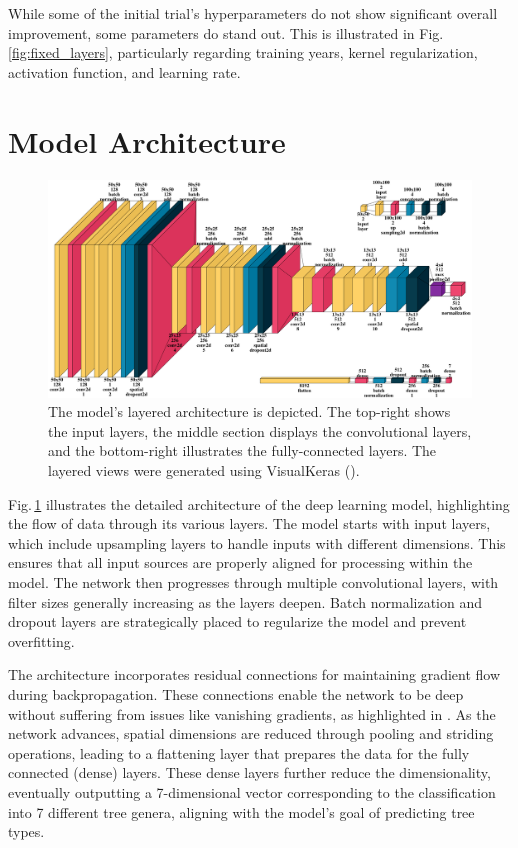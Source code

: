 While some of the initial trial's hyperparameters do not show significant overall improvement, some parameters do stand out. This is illustrated in Fig.\,\ref{fig:fixed_layers}, particularly regarding training years, kernel regularization, activation function, and learning rate.

\section{Model Architecture}

\begin{figure}[ht]
    \centering
    \includegraphics[width=0.9\linewidth]{figures/figures_tuner/model_layered_view.png}
    \caption{The model's layered architecture is depicted. The top-right shows the input layers, the middle section displays the convolutional layers, and the bottom-right illustrates the fully-connected layers. The layered views were generated using VisualKeras (\cite{visualkeras}).}
    \label{fig:model_layered_view}
\end{figure}

Fig.\,\ref{fig:model_layered_view} illustrates the detailed architecture of the deep learning model, highlighting the flow of data through its various layers. The model starts with input layers, which include upsampling layers to handle inputs with different dimensions. This ensures that all input sources are properly aligned for processing within the model. The network then progresses through multiple convolutional layers, with filter sizes generally increasing as the layers deepen. Batch normalization and dropout layers are strategically placed to regularize the model and prevent overfitting.

The architecture incorporates residual connections for maintaining gradient flow during backpropagation. These connections enable the network to be deep without suffering from issues like vanishing gradients, as highlighted in \cite{resnet}. As the network advances, spatial dimensions are reduced through pooling and striding operations, leading to a flattening layer that prepares the data for the fully connected (dense) layers. These dense layers further reduce the dimensionality, eventually outputting a 7-dimensional vector corresponding to the classification into 7 different tree genera, aligning with the model's goal of predicting tree types.



